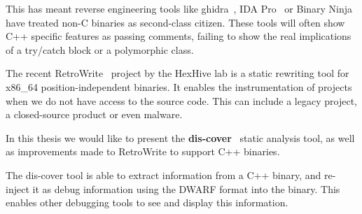 \documentclass[a4paper,11pt,oneside]{report}
\begin{document}

This has meant reverse engineering tools like ghidra~\cite{ghidra}, IDA Pro~\cite{ida} or Binary Ninja~\cite{binja} have treated non-C binaries as second-class citizen.
These tools will often show C++ specific features as passing comments, failing to show the real implications of a try/catch block or a polymorphic class.



The recent RetroWrite~\cite{dinesh20oakland} project by the HexHive lab is a static rewriting tool for x86\_64 position-independent binaries.
It enables the instrumentation of projects when we do not have access to the source code.
This can include a legacy project, a closed-source product or even malware.




In this thesis we would like to present the \textbf{dis-cover}~\cite{discovergithub} static analysis tool,
as well as improvements made to RetroWrite to support C++ binaries.



The dis-cover tool is able to extract information from a C++ binary, and re-inject it as debug information using the DWARF format into the binary.
This enables other debugging tools to see and display this information.


\end{document}
